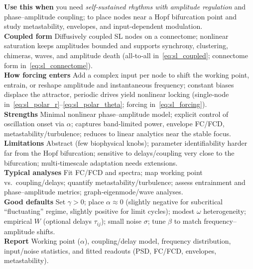 \documentclass[11pt]{article}
\numberwithin{equation}{section}
\begin{document}
\begin{tcolorbox}[
  colback=gray!5,
  colframe=slate,
  colbacktitle=softblue!25,
  coltitle=softblue!60!black,
  fonttitle=\bfseries\small,
  title={\small When to Use It},
  boxrule=0.4pt, enhanced, sharp corners,
  left=4pt,right=4pt,top=3pt,bottom=3pt,
  boxsep=2pt, before skip=6pt, after skip=6pt
]
\scriptsize
\textbf{Use this when} you need \emph{self‑sustained rhythms with amplitude regulation} and phase–amplitude coupling; to place nodes near a Hopf bifurcation point and study metastability, envelopes, and input‑dependent modulation.\\
\textbf{Coupled form} Diffusively coupled SL nodes on a connectome; nonlinear saturation keeps amplitudes bounded and supports synchrony, clustering, chimeras, waves, and amplitude death (all‑to‑all in~\eqref{eq:sl_coupled}; connectome form in~\eqref{eq:sl_connectome}).\\
\textbf{How forcing enters} Add a complex input per node to shift the working point, entrain, or reshape amplitude and instantaneous frequency; constant biases displace the attractor, periodic drives yield nonlinear locking (single‑node in~\eqref{eq:sl_polar_r}–\eqref{eq:sl_polar_theta}; forcing in~\eqref{eq:sl_forcing}).\\
\textbf{Strengths} Minimal nonlinear phase–amplitude model; explicit control of oscillation onset via $\alpha$; captures band‑limited power, envelope FC/FCD, metastability/turbulence; reduces to linear analytics near the stable focus.\\
\textbf{Limitations} Abstract (few biophysical knobs); parameter identifiability harder far from the Hopf bifurcation; sensitive to delays/coupling very close to the bifurcation; multi‑timescale adaptation needs extensions.\\
\textbf{Typical analyses} Fit FC/FCD and spectra; map working point vs.\ coupling/delays; quantify metastability/turbulence; assess entrainment and phase–amplitude metrics; graph‑eigenmode/wave analyses.\\
\textbf{Good defaults} Set $\gamma>0$; place $\alpha\approx 0$ (slightly negative for subcritical “fluctuating” regime, slightly positive for limit cycles); modest $\omega$ heterogeneity; empirical $W$ (optional delays $\tau_{ij}$); small noise $\sigma$; tune $\beta$ to match frequency–amplitude shifts.\\
\textbf{Report} Working point ($\alpha$), coupling/delay model, frequency distribution, input/noise statistics, and fitted readouts (PSD, FC/FCD, envelopes, metastability).
\end{tcolorbox}
\end{document}
